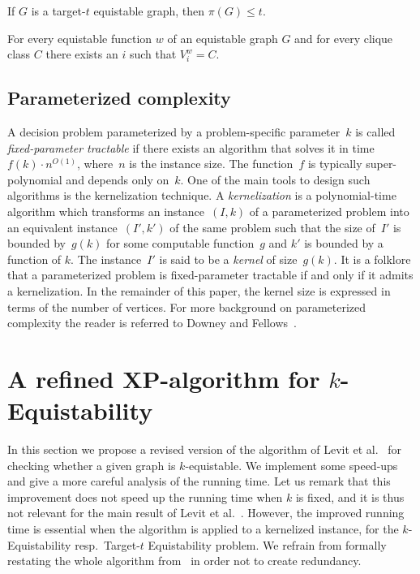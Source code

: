 \documentclass{llncs}
\begin{document}
\begin{corollary}\label{cor:target-t-number-of-classes}
If $G$ is a target-$t$ equistable graph, then $\pi(G) \le t$.
\end{corollary}

\begin{lemma}\label{lem:twin-same-weight}
For every equistable function $w$ of an equistable graph $G$ and for every clique class $C$ there exists an $i$ such that
$V^w_i=C$.
\end{lemma}

\subsection{Parameterized complexity}

\begin{sloppypar}
A decision problem parameterized by a problem-specific parameter~$k$ is called \emph{fixed-parameter tractable} if there exists an algorithm that solves it in time \hbox{$f(k) \cdot n^{O(1)}$}, where~$n$ is the instance size.
The function~$f$ is typically super-polynomial and depends only on~$k$.
One of the main tools to design such algorithms is the kernelization technique.
A \emph{kernelization} is a polynomial-time algorithm which transforms an instance~$(I,k)$ of a parameterized problem into an equivalent instance~$(I',k')$ of the same problem such that the size of~$I'$ is bounded by~$g(k)$ for some computable function~$g$ and $k'$ is bounded by a function of $k$.
The instance~$I'$ is said to be a \emph{kernel} of size~$g(k)$.
It is a folklore that a parameterized problem is fixed-parameter tractable if and only if it admits a kernelization. In the remainder of this paper, the kernel size is expressed in terms of the number of vertices.
For more background on parameterized complexity the reader is referred to
Downey and Fellows~\cite{DF13}.
\end{sloppypar}

\section{A refined XP-algorithm for {\sc $k$-Equistability}}\label{sec:XP}

In this section we propose a revised version of the algorithm of Levit et al.~\cite{MR3040147} for checking whether a given graph is $k$-equistable.
We implement some speed-ups and give a more careful analysis of the running time. Let us remark that this improvement does not speed up the running time when $k$ is fixed, and it is thus not relevant for the main result of Levit et al.~\cite{MR3040147}.
However, the improved running time is essential when the algorithm is applied to a kernelized instance, for the
{\sc $k$-Equistability} resp.~{\sc Target-$t$ Equistability} problem.
We refrain from formally restating the whole algorithm from~\cite{MR3040147} in order not to create redundancy.
\end{document}
